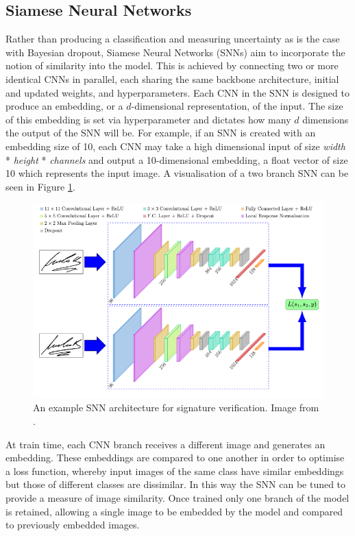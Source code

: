 \subsection{Siamese Neural Networks}\label{ch:ID,sec:deciding,sub:SNN}

Rather than producing a classification and measuring uncertainty as is the case with Bayesian dropout, Siamese Neural Networks (SNNs) aim to incorporate the notion of similarity into the model. This is achieved by connecting two or more identical CNNs in parallel, each sharing the same backbone architecture, initial and updated weights, and hyperparameters. Each CNN in the SNN is designed to produce an embedding, or a  $d$-dimensional representation, of the input. The size of this embedding is set via hyperparameter and dictates how many $d$ dimensions the output of the SNN will be. For example, if an SNN is created with an embedding size of 10, each CNN may take a high dimensional input of size \textit{width} * \textit{height} * \textit{channels} and output a 10-dimensional embedding, a float vector of size 10 which represents the input image. A visualisation of a two branch SNN can be seen in Figure \ref{fig:signet-SNN-architecture}.

\begin{figure}
	\begin{center}
		\includegraphics[scale=0.4]{Chapter5/figs/signet-SNN-architecture.png}
	\end{center}
	\caption{An example SNN architecture for signature verification. Image from \cite{dey_signet_2017}.}
	\label{fig:signet-SNN-architecture}
\end{figure}

At train time, each CNN branch receives a different image and generates an embedding. These embeddings are compared to one another in order to optimise a loss function, whereby input images of the same class have similar embeddings but those of different classes are dissimilar. In this way the SNN can be tuned to provide a measure of image similarity. Once trained only one branch of the model is retained, allowing a single image to be embedded by the model and compared to previously embedded images.

